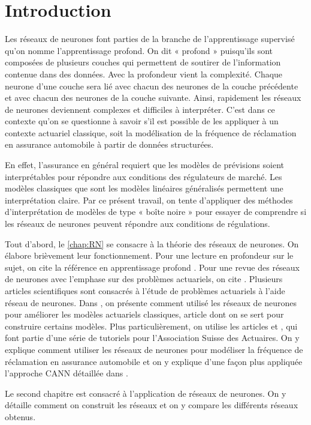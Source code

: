 \chapter*{Introduction}         %
\label{chap:introduction}       %


Les réseaux de neurones font parties de la branche de l'apprentissage supervisé qu'on nomme l'apprentissage profond. On dit « profond » puisqu'ils sont composées de plusieurs couches qui permettent de soutirer de l'information contenue dans des données. Avec la profondeur vient la complexité. Chaque neurone d'une couche sera lié avec chacun des neurones de la couche précédente et avec chacun des neurones de la couche suivante. Ainsi, rapidement les réseaux de neurones deviennent complexes et difficiles à interpréter. C'est dans ce contexte qu'on se questionne à savoir s'il est possible de les appliquer à un contexte actuariel classique, soit la modélisation de la fréquence de réclamation en assurance automobile à partir de données structurées. 

En effet, l'assurance en général requiert que les modèles de prévisions soient interprétables pour répondre aux conditions des régulateurs de marché. Les modèles classiques que sont les modèles linéaires généralisés permettent une interprétation claire. Par ce présent travail, on tente d'appliquer des méthodes d'interprétation de modèles de type « boîte noire » pour essayer de comprendre si les réseaux de neurones peuvent répondre aux conditions de régulations.

Tout d'abord, le \autoref{chap:RN} se consacre à la théorie des réseaux de neurones. On élabore brièvement leur fonctionnement. Pour une lecture en profondeur sur le sujet, on cite la référence en apprentissage profond \citep{Goodfellow-et-al-2016}. Pour une revue des réseaux de neurones avec l'emphase sur des problèmes actuariels, on cite \citet{denuit2019effective}. Plusieurs articles scientifiques sont consacrés à l'étude de problèmes actuariels à l'aide réseau de neurones. Dans \citet{wuthrich2019generalized}, on présente comment utilisé les réseaux de neurones pour améliorer les modèles actuariels classiques, article dont on se sert pour construire certains modèles. Plus particulièrement, on utilise les articles \citet{ferrario2018insights} et \citep{schelldorfer2019nesting}, qui font partie d'une série de tutoriels pour l'Association Suisse des Actuaires. On y explique comment utiliser les réseaux de neurones pour modéliser la fréquence de réclamation en assurance automobile et on y explique d'une façon plus appliquée l'approche CANN détaillée dans \citet{wuthrich2019generalized}. 

Le second chapitre est consacré à l'application de réseaux de neurones. On y détaille comment on construit les réseaux et on y compare les différents réseaux obtenus.